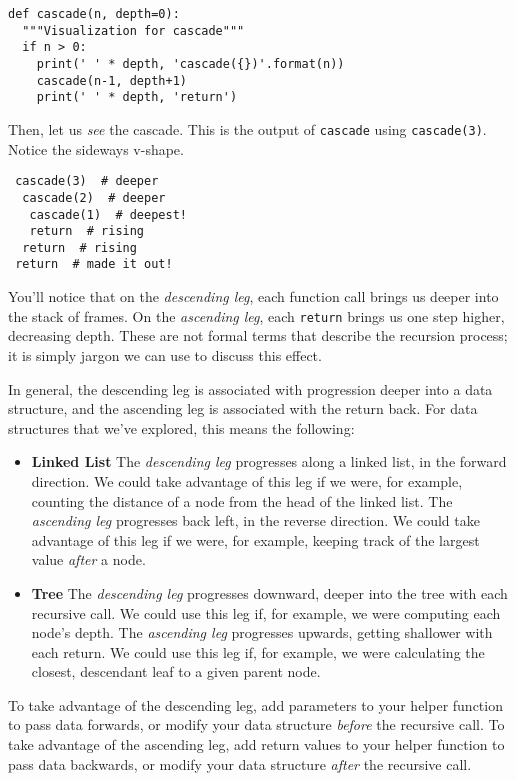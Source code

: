 \documentclass[a4paper]{book}
\begin{document}
\begin{lstlisting}
def cascade(n, depth=0):
  """Visualization for cascade"""
  if n > 0:
    print(' ' * depth, 'cascade({})'.format(n))
    cascade(n-1, depth+1)
    print(' ' * depth, 'return')
\end{lstlisting}

Then, let us \textit{see} the cascade. This is the output of {\tt cascade} using {\tt cascade(3)}. Notice the sideways v-shape.

\begin{lstlisting}
 cascade(3)  # deeper
  cascade(2)  # deeper
   cascade(1)  # deepest!
   return  # rising
  return  # rising
 return  # made it out!
\end{lstlisting}

You'll notice that on the \textit{descending leg}, each function call brings us deeper into the stack of frames. On the \textit{ascending leg}, each {\tt return} brings us one step higher, decreasing depth. These are not formal terms that describe the recursion process; it is simply jargon we can use to discuss this effect.

In general, the descending leg is associated with progression deeper into a data structure, and the ascending leg is associated with the return back. For data structures that we've explored, this means the following:
\begin{itemize}
\item \textbf{Linked List} The \textit{descending leg} progresses along a linked list, in the forward direction. We could take advantage of this leg if we were, for example, counting the distance of a node from the head of the linked list. The \textit{ascending leg} progresses back left, in the reverse direction. We could take advantage of this leg if we were, for example, keeping track of the largest value \textit{after} a node.
\item \textbf{Tree} The \textit{descending leg} progresses downward, deeper into the tree with each recursive call. We could use this leg if, for example, we were computing each node's depth. The \textit{ascending leg} progresses upwards, getting shallower with each return. We could use this leg if, for example, we were calculating the closest, descendant leaf to a given parent node.
\end{itemize}
To take advantage of the descending leg, add parameters to your helper function to pass data forwards, or modify your data structure \textit{before} the recursive call. To take advantage of the ascending leg, add return values to your helper function to pass data backwards, or modify your data structure \textit{after} the recursive call.
\end{document}
